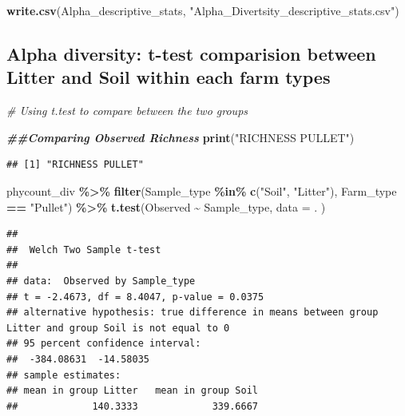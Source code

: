 \documentclass[
]{article}
\newenvironment{Shaded}{\begin{snugshade}}{\end{snugshade}}
\newcommand{\AttributeTok}[1]{\textcolor[rgb]{0.13,0.29,0.53}{#1}}
\newcommand{\CommentTok}[1]{\textcolor[rgb]{0.56,0.35,0.01}{\textit{#1}}}
\newcommand{\DocumentationTok}[1]{\textcolor[rgb]{0.56,0.35,0.01}{\textbf{\textit{#1}}}}
\newcommand{\FunctionTok}[1]{\textcolor[rgb]{0.13,0.29,0.53}{\textbf{#1}}}
\newcommand{\NormalTok}[1]{#1}
\newcommand{\SpecialCharTok}[1]{\textcolor[rgb]{0.81,0.36,0.00}{\textbf{#1}}}
\newcommand{\StringTok}[1]{\textcolor[rgb]{0.31,0.60,0.02}{#1}}
\begin{document}
\begin{Shaded}
\begin{Highlighting}[]
\FunctionTok{write.csv}\NormalTok{(Alpha\_descriptive\_stats, }\StringTok{"Alpha\_Divertsity\_descriptive\_stats.csv"}\NormalTok{)}
\end{Highlighting}
\end{Shaded}

\subsection{Alpha diversity: t-test comparision between Litter and Soil
within each farm
types}\label{alpha-diversity-t-test-comparision-between-litter-and-soil-within-each-farm-types}

\begin{Shaded}
\begin{Highlighting}[]
\CommentTok{\# Using t.test to compare between the two groups}

\DocumentationTok{\#\#Comparing Observed Richness}
\FunctionTok{print}\NormalTok{(}\StringTok{"RICHNESS PULLET"}\NormalTok{)}
\end{Highlighting}
\end{Shaded}

\begin{verbatim}
## [1] "RICHNESS PULLET"
\end{verbatim}

\begin{Shaded}
\begin{Highlighting}[]
\NormalTok{phycount\_div }\SpecialCharTok{\%\textgreater{}\%}
  \FunctionTok{filter}\NormalTok{(Sample\_type }\SpecialCharTok{\%in\%} \FunctionTok{c}\NormalTok{(}\StringTok{"Soil"}\NormalTok{, }\StringTok{"Litter"}\NormalTok{),}
\NormalTok{         Farm\_type }\SpecialCharTok{==} \StringTok{"Pullet"}\NormalTok{) }\SpecialCharTok{\%\textgreater{}\%}
  \FunctionTok{t.test}\NormalTok{(Observed }\SpecialCharTok{\textasciitilde{}}\NormalTok{ Sample\_type, }
       \AttributeTok{data =}\NormalTok{ .}
\NormalTok{       )}
\end{Highlighting}
\end{Shaded}

\begin{verbatim}
## 
##  Welch Two Sample t-test
## 
## data:  Observed by Sample_type
## t = -2.4673, df = 8.4047, p-value = 0.0375
## alternative hypothesis: true difference in means between group Litter and group Soil is not equal to 0
## 95 percent confidence interval:
##  -384.08631  -14.58035
## sample estimates:
## mean in group Litter   mean in group Soil 
##             140.3333             339.6667
\end{verbatim}
\end{document}
